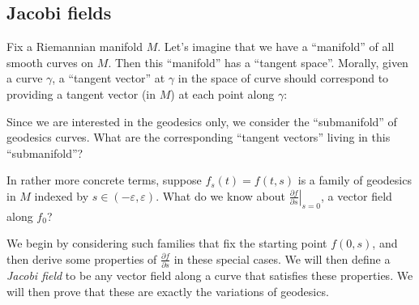 \documentclass[a4paper]{article}
\begin{document}
\subsection{Jacobi fields}
Fix a Riemannian manifold $M$. Let's imagine that we have a ``manifold'' of all smooth curves on $M$. Then this ``manifold'' has a ``tangent space''. Morally, given a curve $\gamma$, a ``tangent vector'' at $\gamma$ in the space of curve should correspond to providing a tangent vector (in $M$) at each point along $\gamma$:
\begin{center}
\end{center}
Since we are interested in the geodesics only, we consider the ``submanifold'' of geodesics curves. What are the corresponding ``tangent vectors'' living in this ``submanifold''?

In rather more concrete terms, suppose $f_s(t) = f(t, s)$ is a family of geodesics in $M$ indexed by $s \in (-\varepsilon, \varepsilon)$. What do we know about $\left.\frac{\partial f}{\partial s}\right|_{s = 0}$, a vector field along $f_0$?

We begin by considering such families that fix the starting point $f(0, s)$, and then derive some properties of $\frac{\partial f}{\partial s}$ in these special cases. We will then define a \emph{Jacobi field} to be any vector field along a curve that satisfies these properties. We will then prove that these are exactly the variations of geodesics.
\end{document}
